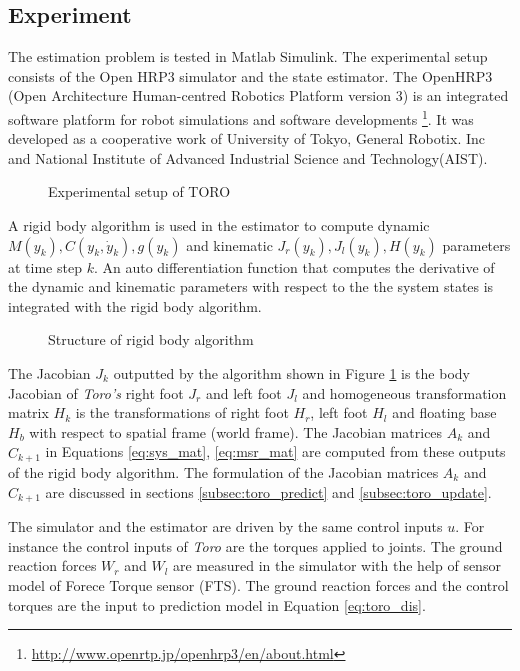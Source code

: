 \subsection{Experiment}
The estimation problem is tested in Matlab Simulink. The experimental setup consists of the Open HRP3 simulator and the state estimator. The OpenHRP3 (Open Architecture Human-centred Robotics Platform version 3) is an integrated software platform for robot simulations and software developments \footnote{\url{http://www.openrtp.jp/openhrp3/en/about.html}}. It was developed as a cooperative work of University of Tokyo, General Robotix. Inc and National Institute of Advanced Industrial Science and Technology(AIST).

\begin{figure}[H]
    \centering
    
    \caption{Experimental setup of TORO}
\end{figure}

A rigid body algorithm is used in the estimator to compute dynamic $M(y_k), C(y_k,\dot y_k), g(y_k)$ and kinematic $J_r(y_k), J_l(y_k), H(y_k)$ parameters at time step $k$. An auto differentiation function that computes the derivative of the dynamic and kinematic parameters with respect to the the system states is integrated with the rigid body algorithm. 
\begin{figure}[H]
    \centering
    
    \caption{Structure of rigid body algorithm}
    \label{fig:luc_dyn}
\end{figure}
The Jacobian $J_k$ outputted by the algorithm shown in Figure \ref{fig:luc_dyn} is the body Jacobian of \emph{Toro's} right foot $J_r$ and left foot $J_l$ and homogeneous transformation matrix $H_k$ is the transformations of right foot $H_r$, left foot $H_l$ and floating base $H_b$ with respect to spatial frame (world frame).
The Jacobian matrices $A_k$ and $\hat C_{k+1}$ in Equations \ref{eq:sys_mat}, \ref{eq:msr_mat} are computed from these outputs of the rigid body algorithm. The formulation of the Jacobian matrices $A_k$ and $\hat C_{k+1}$ are discussed in sections \ref{subsec:toro_predict} and \ref{subsec:toro_update}. 

The simulator and the estimator are driven by the same control inputs $u$. For instance the control inputs of \emph{Toro} are the torques applied to joints. The ground reaction forces $W_r$ and $W_l$ are measured in the simulator with the help of sensor model of Forece Torque sensor (FTS). The ground reaction forces and the control torques are the input to prediction model in Equation \ref{eq:toro_dis}.

